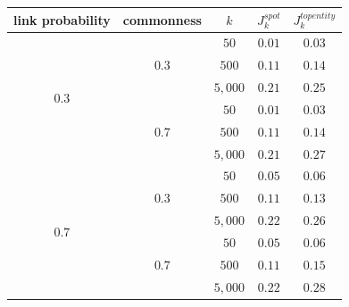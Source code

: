 

\begin{tabular}{ccccc}
\toprule
link probability & commonness & $k$ & $J^{spot}_k$ & $J^{top entity}_k$ \\
\midrule
\multirow{6}{*}{$0.3$} &  \multirow{3}{*}{$0.3$} & $50$ &  $0.01$  &   $0.03$  \\
					 &						   & $500$ 	&  $0.11$  &   $0.14$  \\
					 &						   & $5,000$ & $0.21$   &  $0.25$    \\
\cline{2-5}
					 &	\multirow{3}{*}{$0.7$}  & $50$      & $0.01$   &   $0.03$ \\
					 &						   & $500$   	& $0.11$   &   $0.14$  \\
					 &						   & $5,000$ 	& $0.21$   &   $0.27$    \\
					
\midrule		
\multirow{6}{*}{$0.7$} &  \multirow{3}{*}{$0.3$}   & $50$  & $0.05$   &   $0.06$  \\
					 &						   & $500$ 	   &   $0.11$   &    $0.13$  \\
					 &						   & $5,000$   &   $0.22$   &  $0.26$  \\
\cline{2-5}

					 &	\multirow{3}{*}{$0.7$}  & $50$   &  $0.05$   &  $0.06$  \\
					 &						   & $500$   &  $0.11$   &   $0.15$   \\
					 &						   & $5,000$ &  $0.22$   &   $0.28$  \\
\bottomrule
\end{tabular}

